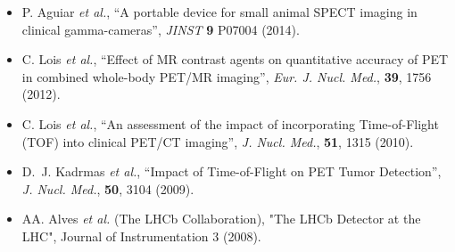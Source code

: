 \documentclass[letterpaper]{article}
\begin{document}
\begin{itemize} 

     \item P. Aguiar  {\em et al.}, ``A portable device for small animal SPECT imaging in clinical gamma-cameras'', \textit{JINST} \textbf{9} P07004 (2014).

    \item C. Lois {\em et al.}, ``Effect of MR contrast agents on quantitative
        accuracy of PET in combined whole-body PET/MR imaging'', \textit{Eur. J.
        Nucl. Med.}, \textbf{39}, 1756 (2012).

    \item C. Lois {\em et al.}, ``An assessment of the impact of incorporating
        Time-of-Flight (TOF) into clinical PET/CT imaging'', \textit{J. Nucl.
        Med.}, \textbf{51}, 1315 (2010). 
    
    \item D.~J. Kadrmas {\em et al.}, ``Impact of Time-of-Flight on PET Tumor
        Detection'', \textit{J. Nucl. Med.}, \textbf{50},  3104 (2009).
  
   \item AA. Alves {\em et al.} (The LHCb Collaboration), "The LHCb Detector at the LHC", Journal of Instrumentation 3 (2008).
\end{itemize}
\end{document}

